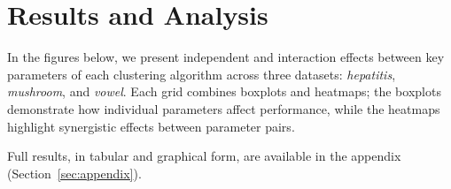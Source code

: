 \section{Results and Analysis}
\label{sec:results-and-analysis}

In the figures below, we present independent and interaction effects between
key parameters of each clustering algorithm across three datasets:
\textit{hepatitis}, \textit{mushroom}, and \textit{vowel}.
Each grid combines boxplots and heatmaps; the boxplots demonstrate how individual
parameters affect performance, while the heatmaps highlight synergistic effects between
parameter pairs.

Full results, in tabular and graphical form, are available in the appendix (Section~\ref{sec:appendix}).












